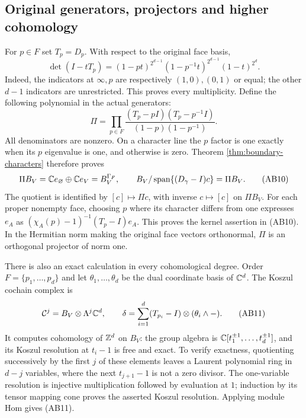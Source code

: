 \subsection{Original generators, projectors and higher cohomology}
For $p\in F$ set $T_p=D_p$. With respect to the original face basis,
\[
 \det(I-tT_p)=(1-pt)^{2^{d-1}}(1-p^{-1}t)^{2^{d-1}}
                    (1-t)^{2^d}.
 \tag{AB8}
\]
Indeed, the indicators at $\infty,p$ are respectively $(1,0),(0,1)$ or
equal; the other $d-1$ indicators are unrestricted. This proves every
multiplicity. Define the following polynomial in the actual generators:
\[
 \Pi=\prod_{p\in F}
 \frac{(T_p-pI)(T_p-p^{-1}I)}{(1-p)(1-p^{-1})}.
 \tag{AB9}
\]
All denominators are nonzero. On a character line the $p$ factor is one
exactly when its $p$ eigenvalue is one, and otherwise is zero. Theorem
\ref{thm:boundary-characters} therefore proves
\[
 \Pi B_V=\mathbb C e_\varnothing\oplus\mathbb C e_V=B_V^{\Gamma_F},\qquad
 B_V/\operatorname{span}\{(D_\gamma-I)c\}=\Pi B_V.
 \tag{AB10}
\]
The quotient is identified by $[c]\mapsto\Pi c$, with inverse
$c\mapsto[c]$ on $\Pi B_V$. For each proper nonempty face, choosing $p$
where its character differs from one expresses $e_A$ as
$(\chi_A(p)-1)^{-1}(T_p-I)e_A$. This proves the kernel assertion in (AB10).
In the Hermitian norm making the original face vectors orthonormal, $\Pi$
is an orthogonal projector of norm one.

There is also an exact calculation in every cohomological degree. Order
$F=\{p_1,\ldots,p_d\}$ and let $\theta_1,\ldots,\theta_d$ be the dual
coordinate basis of $\mathbb C^d$. The Koszul cochain complex is
\[
 \mathcal C^j=B_V\otimes\Lambda^j\mathbb C^d,\qquad
 \delta=\sum_{i=1}^d(T_{p_i}-I)\otimes(\theta_i\wedge-).
 \tag{AB11}
\]
It computes cohomology of $\mathbb Z^d$ on $B_V$: the group algebra is
$\mathbb C[t_1^{\pm1},\ldots,t_d^{\pm1}]$, and its Koszul resolution at
$t_i-1$ is free and exact. To verify exactness, quotienting successively
by the first $j$ of these elements leaves a Laurent polynomial ring in
$d-j$ variables, where the next $t_{j+1}-1$ is not a zero divisor.
The one-variable resolution is injective multiplication followed by
evaluation at $1$; induction by its tensor mapping cone proves the asserted
Koszul resolution. Applying module Hom gives (AB11).

